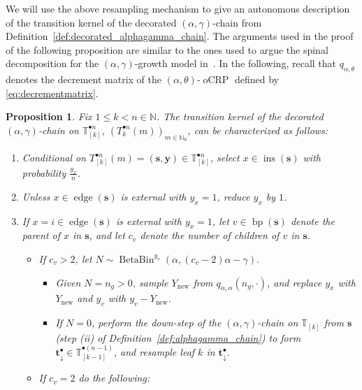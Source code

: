 \documentclass[a4paper, final]{amsart}
\theoremstyle{plain}
\newtheorem{prop}[thm]{Proposition}
\theoremstyle{definition}
\newcommand{\tree}[1][t]{\boldsymbol{#1}}
\newcommand{\T}{\mathbb{T}}
\DeclareMathOperator{\edge}{edge}
\DeclareMathOperator{\insertable}{ins}
\DeclareMathOperator{\branchpoints}{bp}
\newcommand{\insertablef}[1][\tree]{\insertable({\tree[#1]})}
\DeclareMathOperator{\ocrp}{oCRP}
\DeclareMathOperator{\betabin}{BetaBin}
\newcommand{\N}{\mathbb{N}}
\begin{document}
%
We will use the above resampling mechanism to give an autonomous description of the transition kernel of the decorated $(\alpha, \gamma)$-chain from Definition~\ref{def:decorated_alphagamma_chain}.
The arguments used in the proof of the following proposition are similar to the ones used to argue the spinal decomposition for the $(\alpha, \gamma)$-growth model in~\cite{RefWorks:doc:5b4cbb5fe4b02dc0c79270af}.
In the following, recall that $q_{\alpha, \theta}$ denotes the decrement matrix of the $(\alpha, \theta)$-$\ocrp$ defined by \eqref{eq:decrementmatrix}.
%
\begin{prop}\label{prop:decorated_transition_kernel}
  Fix $1 \leq k < n \in \N$.
  The transition kernel of the decorated $(\alpha, \gamma)$-chain on $\T_{[k]}^{\bullet n}$, ${\left( T_k^{\bullet n}(m) \right)}_{m \in \N_0}$, can be characterized as follows:
  \begin{enumerate}[label=2.\alph*]
    \item[1.] Conditional on $T_{[k]}^{\bullet n}(m) = (\tree[s], \mathbf{y}) \in \T_{[k]}^{\bullet n}$, select $x \in \insertablef[s]$ with probability $\frac{y_x}{n}$.
    \item Unless $x \in \edge ( \tree[s] )$ is external with $y_x = 1$, reduce $y_x$ by $1$.
    \item If $x = i \in \edge (\tree[s])$ is external with $y_x = 1$, let $v \in \branchpoints(\tree[s])$ denote the parent of $x$ in $\tree[s]$, and let $c_v$ denote the number of children of $v$ in $\tree[s]$.
      \begin{itemize}
        \item If $c_v > 2$, let $N \sim \betabin^{y_v} (\alpha, (c_v-2)\alpha - \gamma)$. 
          \begin{itemize}
              \item Given $N = n_g > 0$, sample $Y_{\text{new}}$ from $q_{\alpha, \alpha}( n_g, \cdot )$, and replace $y_x$ with $Y_{\text{new}}$ and $y_v$ with $y_v - Y_{\text{new}}$.
              \item If $N = 0$, perform the down-step of the $(\alpha, \gamma)$-chain on $\T_{[k]}$ from $\tree[s]$ (step (ii) of Definition~\ref{def:alphagamma_chain}) to form  $\tree_\downarrow^\bullet \in \T_{[k-1]}^{\bullet (n-1)}$, and resample leaf $k$ in $\tree_\downarrow^\bullet$.
          \end{itemize}
        \item If $c_v=2$ do the following:
          \begin{itemize}

\end{itemize}
\end{itemize}
\end{enumerate}
\end{prop}
\end{document}
